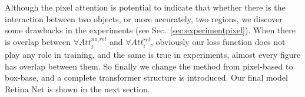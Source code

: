 Although the pixel attention is potential to indicate that whether there is the interaction between two objects, or more accurately, two regions, we discover some drawbacks in the experiments (see Sec.~\ref{sec:experimentpixel}). When there is overlap between $ \forall Att_j^{no\_rel}  $ and $ \forall Att_i^{rel} $, obviously our loss function does not play any role in training, and the same is true in experiments, almost every figure has overlap between them.
So finally we change the method from pixel-based to box-base, and a complete transformer structure is introduced. Our final model Retina Net is shown in the next section.
%
%
%
%
%
%
%
